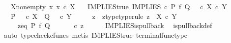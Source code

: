 \begin{isabellebody}
\ \ \ X{\isacharunderscore}{\kern0pt}nonempty{\isacharcolon}{\kern0pt}\ {\isachardoublequoteopen}{\isasymexists}x{\isachardot}{\kern0pt}\ x\ {\isasymin}\isactrlsub c\ X{\isachardoublequoteclose}\isanewline
\ \ \ IMPLIES{\isacharunderscore}{\kern0pt}true{\isacharcolon}{\kern0pt}\ {\isachardoublequoteopen}IMPLIES\ {\isasymcirc}\isactrlsub c\ {\isacharparenleft}{\kern0pt}P\ {\isasymtimes}\isactrlsub f\ Q{\isacharparenright}{\kern0pt}\ {\isacharequal}{\kern0pt}\ {\isasymt}\ {\isasymcirc}\isactrlsub c\ {\isasymbeta}\isactrlbsub X\ {\isasymtimes}\isactrlsub c\ Y\isactrlesub {\isachardoublequoteclose}\isanewline
\ \ \ {\isachardoublequoteopen}P\ {\isacharequal}{\kern0pt}\ {\isasymt}\ {\isasymcirc}\isactrlsub c\ {\isasymbeta}\isactrlbsub X\isactrlesub \ {\isasymLongrightarrow}\ Q\ {\isacharequal}{\kern0pt}\ {\isasymt}\ {\isasymcirc}\isactrlsub c\ {\isasymbeta}\isactrlbsub Y\isactrlesub {\isachardoublequoteclose}\isanewline
%
\isadelimproof
%
\endisadelimproof
%
\isatagproof
{}\isamarkupfalse%
\ {\isacharminus}{\kern0pt}\isanewline
\ \ \isamarkupfalse%
\ z\ \ z{\isacharunderscore}{\kern0pt}type{\isacharbrackleft}{\kern0pt}type{\isacharunderscore}{\kern0pt}rule{\isacharbrackright}{\kern0pt}{\isacharcolon}{\kern0pt}\ {\isachardoublequoteopen}z\ {\isacharcolon}{\kern0pt}\ X\ {\isasymtimes}\isactrlsub c\ Y\ {\isasymrightarrow}\ {\isasymone}\ {\isasymCoprod}\ {\isasymone}\ {\isasymCoprod}\ {\isasymone}{\isachardoublequoteclose}\isanewline
\ \ \ \ \ z{\isacharunderscore}{\kern0pt}eq{\isacharcolon}{\kern0pt}\ {\isachardoublequoteopen}P\ {\isasymtimes}\isactrlsub f\ Q\ {\isacharequal}{\kern0pt}\ {\isacharparenleft}{\kern0pt}{\isasymlangle}{\isasymt}{\isacharcomma}{\kern0pt}{\isasymt}{\isasymrangle}\ {\isasymamalg}\ {\isasymlangle}{\isasymf}{\isacharcomma}{\kern0pt}{\isasymf}{\isasymrangle}\ {\isasymamalg}\ {\isasymlangle}{\isasymf}{\isacharcomma}{\kern0pt}{\isasymt}{\isasymrangle}{\isacharparenright}{\kern0pt}\ {\isasymcirc}\isactrlsub c\ z{\isachardoublequoteclose}\isanewline
\ \ \ \ \isamarkupfalse%
\ IMPLIES{\isacharunderscore}{\kern0pt}is{\isacharunderscore}{\kern0pt}pullback\ \isamarkupfalse%
\ is{\isacharunderscore}{\kern0pt}pullback{\isacharunderscore}{\kern0pt}def\isanewline
\ \ \ \ \isamarkupfalse%
\ {\isacharparenleft}{\kern0pt}auto{\isacharcomma}{\kern0pt}\ typecheck{\isacharunderscore}{\kern0pt}cfuncs{\isacharcomma}{\kern0pt}\ metis\ IMPLIES{\isacharunderscore}{\kern0pt}true\ terminal{\isacharunderscore}{\kern0pt}func{\isacharunderscore}{\kern0pt}type{\isacharparenright}{\kern0pt}\ \ \isanewline

\end{isabellebody}
